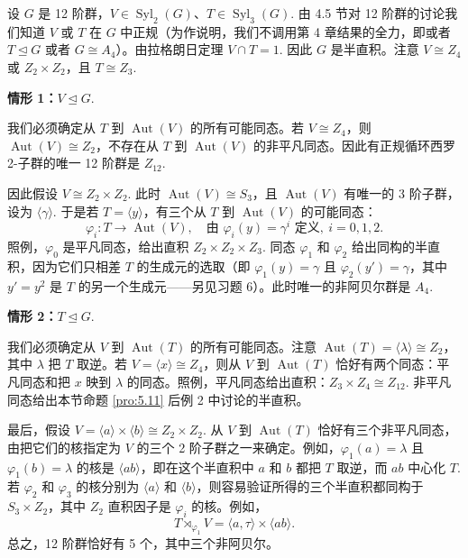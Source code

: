 \begin{example}[12 阶群]
设 \(G\) 是 12 阶群，\(V \in \operatorname{Syl}_2(G)\)、\(T \in \operatorname{Syl}_3(G)\). 由 4.5 节对 12 阶群的讨论我们知道 \(V\) 或 \(T\) 在 \(G\) 中正规（为作说明，我们不调用第 4 章结果的全力，即或者 \(T \trianglelefteq G\) 或者 \(G \cong A_4\)）。由拉格朗日定理 \(V \cap T = 1\). 因此 \(G\) 是半直积。注意 \(V \cong Z_4\) 或 \(Z_2 \times Z_2\)，且 \(T \cong Z_3\).

\textbf{情形 1：}\(V \trianglelefteq G\).

我们必须确定从 \(T\) 到 \(\operatorname{Aut}(V)\) 的所有可能同态。若 \(V \cong Z_4\)，则 \(\operatorname{Aut}(V) \cong Z_2\)，不存在从 \(T\) 到 \(\operatorname{Aut}(V)\) 的非平凡同态。因此有正规循环西罗 2-子群的唯一 12 阶群是 \(Z_{12}\).

因此假设 \(V \cong Z_2 \times Z_2\). 此时 \(\operatorname{Aut}(V) \cong S_3\)，且 \(\operatorname{Aut}(V)\) 有唯一的 3 阶子群，设为 \(\langle \gamma \rangle\). 于是若 \(T = \langle y \rangle\)，有三个从 \(T\) 到 \(\operatorname{Aut}(V)\) 的可能同态：
\[
\varphi_i : T \to \operatorname{Aut}(V), \quad \text{由 } \varphi_i(y) = \gamma^i \text{ 定义},\ i = 0, 1, 2.
\]
照例，\(\varphi_0\) 是平凡同态，给出直积 \(Z_2 \times Z_2 \times Z_3\). 同态 \(\varphi_1\) 和 \(\varphi_2\) 给出同构的半直积，因为它们只相差 \(T\) 的生成元的选取（即 \(\varphi_1(y) = \gamma\) 且 \(\varphi_2(y') = \gamma\)，其中 \(y' = y^2\) 是 \(T\) 的另一个生成元——另见习题 6）。此时唯一的非阿贝尔群是 \(A_4\).

\textbf{情形 2：}\(T \trianglelefteq G\).

我们必须确定从 \(V\) 到 \(\operatorname{Aut}(T)\) 的所有可能同态。注意 \(\operatorname{Aut}(T) = \langle \lambda \rangle \cong Z_2\)，其中 \(\lambda\) 把 \(T\) 取逆。若 \(V = \langle x \rangle \cong Z_4\)，则从 \(V\) 到 \(\operatorname{Aut}(T)\) 恰好有两个同态：平凡同态和把 \(x\) 映到 \(\lambda\) 的同态。照例，平凡同态给出直积：\(Z_3 \times Z_4 \cong Z_{12}\). 非平凡同态给出本节命题 \ref{pro:5.11} 后例 2 中讨论的半直积。

最后，假设 \(V = \langle a \rangle \times \langle b \rangle \cong Z_2 \times Z_2\). 从 \(V\) 到 \(\operatorname{Aut}(T)\) 恰好有三个非平凡同态，由把它们的核指定为 \(V\) 的三个 2 阶子群之一来确定。例如，\(\varphi_1(a) = \lambda\) 且 \(\varphi_1(b) = \lambda\) 的核是 \(\langle ab \rangle\)，即在这个半直积中 \(a\) 和 \(b\) 都把 \(T\) 取逆，而 \(ab\) 中心化 \(T\). 若 \(\varphi_2\) 和 \(\varphi_3\) 的核分别为 \(\langle a \rangle\) 和 \(\langle b \rangle\)，则容易验证所得的三个半直积都同构于 \(S_3 \times Z_2\)，其中 \(Z_2\) 直积因子是 \(\varphi_i\) 的核。例如，
\[
T \rtimes_{\varphi_1} V = \langle a, \tau \rangle \times \langle ab \rangle.
\]
总之，12 阶群恰好有 5 个，其中三个非阿贝尔。
\end{example}

